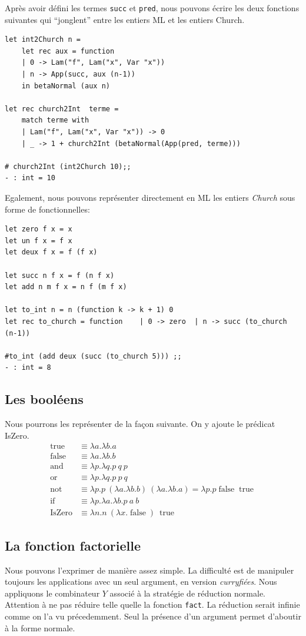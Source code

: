 \documentclass[11pt]{book}
\begin{document}
Après avoir défini les termes \verb+succ+ et \verb+pred+, nous pouvons écrire les deux fonctions suivantes qui ``jonglent''
entre les entiers ML et les entiers Church.
\begin{Verbatim}
let int2Church n = 
	let rec aux = function
	| 0 -> Lam("f", Lam("x", Var "x"))
	| n -> App(succ, aux (n-1))
	in betaNormal (aux n)

let rec church2Int  terme = 
	match terme with
	| Lam("f", Lam("x", Var "x")) -> 0
	| _ -> 1 + church2Int (betaNormal(App(pred, terme)))

# church2Int (int2Church 10);;
- : int = 10
\end{Verbatim}


Egalement, nous pouvons représenter directement en ML les entiers \textit{Church} sous forme de fonctionnelles:
\begin{Verbatim}
let zero f x = x
let un f x = f x
let deux f x = f (f x)

let succ n f x = f (n f x)
let add n m f x = n f (m f x)

let to_int n = n (function k -> k + 1) 0
let rec to_church = function	| 0 -> zero  | n -> succ (to_church (n-1))
	
#to_int (add deux (succ (to_church 5))) ;;
- : int = 8	
\end{Verbatim}

\subsection{Les booléens }
Nous pourrons les représenter de la façon suivante. On y ajoute le prédicat IsZero.
$$
\begin{array}{ll}
\operatorname {true} &\equiv \lambda a.\lambda b.a \\
\operatorname {false} &\equiv \lambda a.\lambda b.b \\
\operatorname {and} &\equiv \lambda p.\lambda q.p\ q\ p\\
\operatorname {or} &\equiv \lambda p.\lambda q.p\ p\ q\\
\operatorname {not} &\equiv \lambda p.p\ (\lambda a.\lambda b.b)\ (\lambda a.\lambda b.a)=\lambda p.p\operatorname {false} \operatorname {true} \\
\operatorname {if} &\equiv \lambda p.\lambda a.\lambda b.p\ a\ b  \\
\operatorname{IsZero} &\equiv  \lambda n.n\ (\lambda x.\operatorname{false})\ \operatorname{true}
\end{array}
$$

\subsection{La fonction factorielle}
Nous pouvons l'exprimer de manière assez simple. La difficulté est de manipuler toujours les applications avec un seul argument, en version
\textit{curryfiées}.
Nous appliquons le combinateur $Y$ associé à la stratégie de réduction normale.
Attention à ne pas réduire telle quelle la fonction \verb+fact+. La réduction serait infinie comme on l'a vu précedemment. Seul la présence
d'un argument permet d'aboutir à la forme normale.
\end{document}

